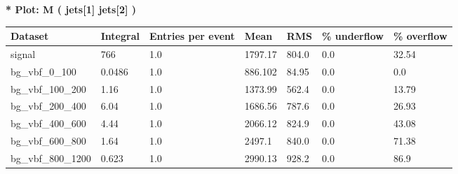 \documentclass[a4paper, 10pt]{article}
\begin{document}
\textbf{* Plot: M ( jets[1] jets[2] ) }\\
   \begin{table}[H]
  \begin{center}
    \begin{tabular}{|m{23.0mm}|m{23.0mm}|m{18.0mm}|m{19.0mm}|m{19.0mm}|m{19.0mm}|m{19.0mm}|}
      \hline
      {\cellcolor{yellow}         Dataset}& {\cellcolor{yellow}         Integral}& {\cellcolor{yellow}         Entries per event}& {\cellcolor{yellow}         Mean}& {\cellcolor{yellow}         RMS}& {\cellcolor{yellow}         \% underflow}& {\cellcolor{yellow}         \% overflow}\\
      \hline
      {\cellcolor{white}         signal}& {\cellcolor{white}         766}& {\cellcolor{white}         1.0}& {\cellcolor{white}         1797.17}& {\cellcolor{white}         804.0}& {\cellcolor{red}         0.0}& {\cellcolor{red}         32.54}\\
      \hline
      {\cellcolor{white}         bg\_vbf\_0\_100}& {\cellcolor{white}         0.0486}& {\cellcolor{white}         1.0}& {\cellcolor{white}         886.102}& {\cellcolor{white}         84.95}& {\cellcolor{green}         0.0}& {\cellcolor{green}         0.0}\\
      \hline
      {\cellcolor{white}         bg\_vbf\_100\_200}& {\cellcolor{white}         1.16}& {\cellcolor{white}         1.0}& {\cellcolor{white}         1373.99}& {\cellcolor{white}         562.4}& {\cellcolor{orange}         0.0}& {\cellcolor{orange}         13.79}\\
      \hline
      {\cellcolor{white}         bg\_vbf\_200\_400}& {\cellcolor{white}         6.04}& {\cellcolor{white}         1.0}& {\cellcolor{white}         1686.56}& {\cellcolor{white}         787.6}& {\cellcolor{red}         0.0}& {\cellcolor{red}         26.93}\\
      \hline
      {\cellcolor{white}         bg\_vbf\_400\_600}& {\cellcolor{white}         4.44}& {\cellcolor{white}         1.0}& {\cellcolor{white}         2066.12}& {\cellcolor{white}         824.9}& {\cellcolor{red}         0.0}& {\cellcolor{red}         43.08}\\
      \hline
      {\cellcolor{white}         bg\_vbf\_600\_800}& {\cellcolor{white}         1.64}& {\cellcolor{white}         1.0}& {\cellcolor{white}         2497.1}& {\cellcolor{white}         840.0}& {\cellcolor{red}         0.0}& {\cellcolor{red}         71.38}\\
      \hline
      {\cellcolor{white}         bg\_vbf\_800\_1200}& {\cellcolor{white}         0.623}& {\cellcolor{white}         1.0}& {\cellcolor{white}         2990.13}& {\cellcolor{white}         928.2}& {\cellcolor{red}         0.0}& {\cellcolor{red}         86.9}\\

\end{tabular}
\end{center}
\end{table}
\end{document}

